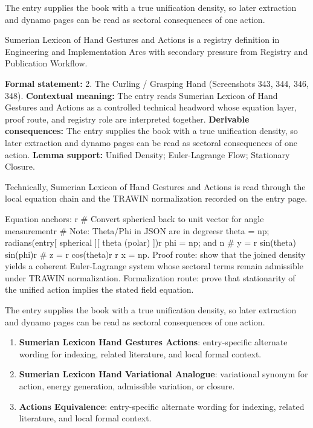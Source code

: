 The entry supplies the book with a true unification density, so later extraction and dynamo pages can be read as sectoral consequences of one action.
\clearpage


\begingroup\small
{}
Sumerian Lexicon of Hand Gestures and Actions is a registry definition in Engineering and Implementation Arcs with secondary pressure from Registry and Publication Workflow.

\begingroup\footnotesize\setlength{\emergencystretch}{3em}\sloppy
\textbf{Formal statement:} 2. The Curling / Grasping Hand (Screenshots 343, 344, 346, 348). \textbf{Contextual meaning:} The entry reads Sumerian Lexicon of Hand Gestures and Actions as a controlled technical headword whose equation layer, proof route, and registry role are interpreted together. \textbf{Derivable consequences:} The entry supplies the book with a true unification density, so later extraction and dynamo pages can be read as sectoral consequences of one action. \textbf{Lemma support:} Unified Density; Euler-Lagrange Flow; Stationary Closure.\par
\endgroup

Technically, Sumerian Lexicon of Hand Gestures and Actions is read through the local equation chain and the TRAWIN normalization recorded on the entry page.

Equation anchors: r \# Convert spherical back to unit vector for angle measurementr \# Note: Theta/Phi in JSON are in degreesr theta = np; radians(entry[ spherical ][ theta (polar) ])r phi = np; and n \# y = r sin(theta) sin(phi)r \# z = r cos(theta)r r x = np. Proof route: show that the joined density yields a coherent Euler-Lagrange system whose sectoral terms remain admissible under TRAWIN normalization. Formalization route: prove that stationarity of the unified action implies the stated field equation.

The entry supplies the book with a true unification density, so later extraction and dynamo pages can be read as sectoral consequences of one action.
\endgroup

\begin{enumerate}[leftmargin=1.6em,itemsep=6pt,topsep=4pt]
\item \textbf{Sumerian Lexicon Hand Gestures Actions}: entry-specific alternate wording for indexing, related literature, and local formal context.
\item \textbf{Sumerian Lexicon Hand Variational Analogue}: variational synonym for action, energy generation, admissible variation, or closure.
\item \textbf{Actions Equivalence}: entry-specific alternate wording for indexing, related literature, and local formal context.
\end{enumerate}

